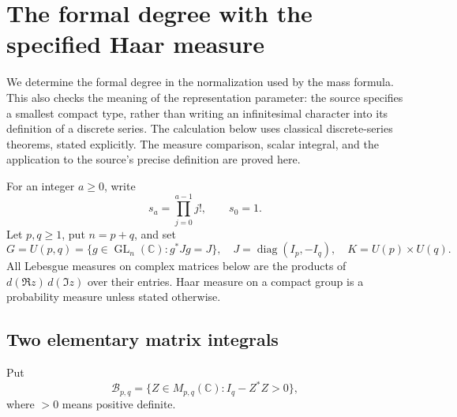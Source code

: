 \section{The formal degree with the specified Haar measure}
\label{fd-section}

We determine the formal degree in the normalization used by the mass
formula. This also checks the meaning of the representation parameter:
the source specifies a smallest compact type, rather than writing an
infinitesimal character into its definition of a discrete series.
The calculation below uses classical discrete-series theorems, stated
explicitly. The measure comparison, scalar integral, and the application
to the source's precise definition are proved here.

For an integer $a\ge0$, write
\[
                     s_a=\prod_{j=0}^{a-1}j!,\qquad s_0=1.
\]
Let $p,q\ge1$, put $n=p+q$, and set
\[
 G=U(p,q)=\{g\in\operatorname{GL}_n(\mathbb C):g^*Jg=J\},
 \quad J=\operatorname{diag}(I_p,-I_q),\quad
 K=U(p)\times U(q).
\]
All Lebesgue measures on complex matrices below are the products
of $d(\Re z)\,d(\Im z)$ over their entries. Haar measure on a compact
group is a probability measure unless stated otherwise.

\subsection{Two elementary matrix integrals}

Put
\[
 \mathcal B_{p,q}=\{Z\in M_{p,q}(\mathbb C):I_q-Z^*Z>0\},
\]
where $>0$ means positive definite.

